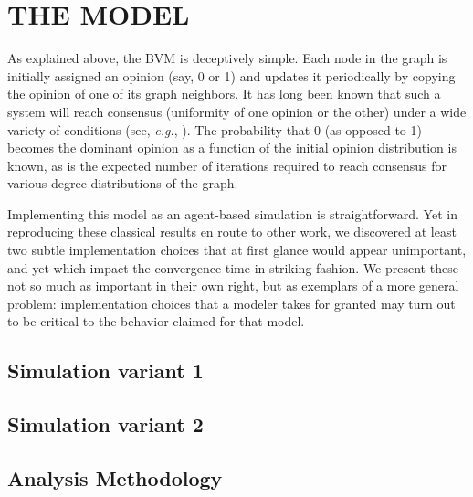 
\section{THE MODEL}

As explained above, the BVM is deceptively simple. Each node in the graph is
initially assigned an opinion (say, 0 or 1) and updates it periodically by
copying the opinion of one of its graph neighbors. It has long been known that
such a system will reach consensus (uniformity of one opinion or the other)
under a wide variety of conditions (see, \textit{e.g.},
\cite{sood_voter_2005}). The probability that 0 (as opposed to 1) becomes the
dominant opinion as a function of the initial opinion distribution is known,
as is the expected number of iterations required to reach consensus for
various degree distributions of the graph.

Implementing this model as an agent-based simulation is straightforward. Yet
in reproducing these classical results en route to other work, we discovered
at least two subtle implementation choices that at first glance would appear
unimportant, and yet which impact the convergence time in striking fashion. We
present these not so much as important in their own right, but as exemplars of
a more general problem: implementation choices that a modeler takes for
granted may turn out to be critical to the behavior claimed for that model.

\subsection{Simulation variant 1}

\subsection{Simulation variant 2}

\subsection{Analysis Methodology}






